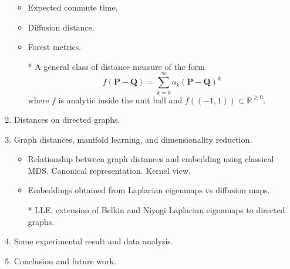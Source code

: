 \documentclass{article}
\begin{document}
\begin{enumerate}
  \begin{itemize}
  \item Expected commute time.
  \item Diffusion distance.
  \item Forest metrics.
  \item[*] A general class of distance measure of the form
    \begin{equation}
      \label{eq:1}
      f(\mathbf{P} - \mathbf{Q}) = \sum_{k = 0}^{\infty}a_k(\mathbf{P}- \mathbf{Q})^{k}
    \end{equation}
    where $f$ is analytic inside the unit ball and $f((-1,1)) \subset
    \mathbb{R}^{\geq 0}$. 
  \end{itemize}
\item Distances on directed graphs.
\item Graph distances, manifold learning, and dimensionality
  reduction. 
  \begin{itemize}
  \item Relationship between graph distances and embedding using
    classical MDS. Canonical representation. Kernel view.
  \item  Embeddings obtained from Laplacian eigenmaps vs diffusion maps.
  \item[*] LLE, extension of Belkin and Niyogi Laplacian eigenmaps to
    directed graphs.
  \end{itemize}
\item Some experimental result and data analysis.
\item Conclusion and future work.
\end{enumerate}
\end{document}
